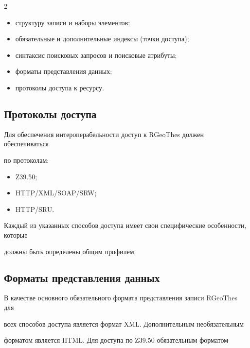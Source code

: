 \begin{multicols}{2}
\begin{itemize}
\item структуру записи и наборы элементов;

\item обязательные и дополнительные индексы (точки доступа);

\item синтаксис поисковых запросов и поисковые атрибуты;

\item форматы представления данных;

\item протоколы доступа к ресурсу.

\end{itemize}



  \subsection{Протоколы доступа}

  

  Для обеспечения интероперабельности доступ к \mbox{RGeoThes} должен обеспечиваться 

по протоколам:

  \begin{itemize}

\item Z39.50;

\item HTTP/XML/SOAP/SRW;

\item HTTP/SRU.

\end{itemize}



  Каждый из указанных способов доступа имеет свои специфические особенности, которые 

должны быть определены общим профилем.

  

  \subsection{Форматы представления данных}

  

  В качестве основного обязательного формата представления записи \mbox{RGeoThes} для 

всех способов доступа является формат {XML}. Дополнительным необязательным 

форматом является {HTML}. Для доступа по Z39.50 обязательным форматом 


\end{multicols}

